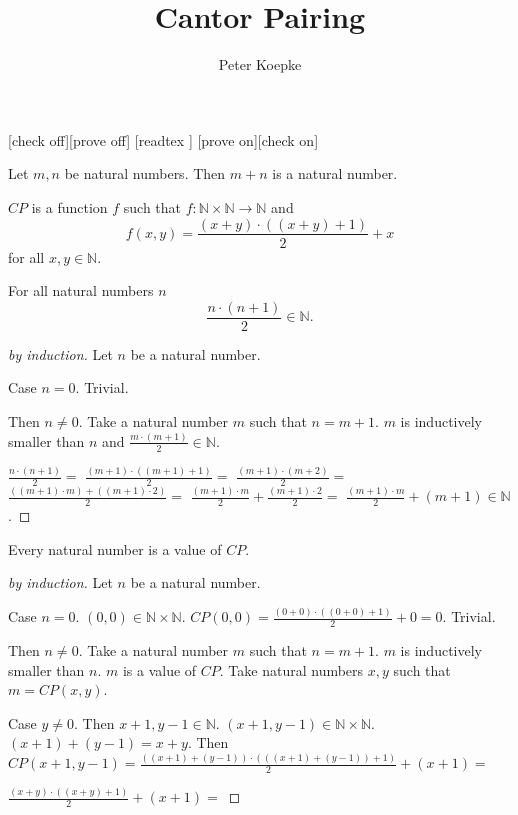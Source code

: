 \documentclass{article}
\title{Cantor Pairing}
\author{Peter Koepke}
\date{}
\begin{document}
\begin{forthel}

[check off][prove off]
[readtex ]
[prove on][check on]

\begin{lemma}
Let $m,n$ be natural numbers. Then $m+n$ is a natural number.
\end{lemma}

\begin{signature}
$CP$ is a function $f$ such that 
$f : \mathbb{N} \times \mathbb{N} \rightarrow \mathbb{N}$
and \[f(x,y) = \frac{(x+y)\cdot((x+y)+1)}{2} + x\]
 for all $x,y \in \mathbb{N}$.
\end{signature}

\begin{lemma}
For all natural numbers $n$
\[\frac{n \cdot (n+1)}{2} \in \mathbb{N}.\]
\end{lemma}
\begin{proof}[by induction]
Let $n$ be a natural number.

Case $n=0$. Trivial.

Then $n \neq 0$. Take a natural number $m$ such that $n = m + 1$.
$m$ is inductively smaller than $n$ and
$\frac{m \cdot (m+1)}{2} \in \mathbb{N}$.

$\frac{n \cdot (n+1)}{2} =$
%
$\frac{(m+1) \cdot ((m+1)+1)}{2} =$
%
$\frac{(m+1) \cdot (m+2)}{2} =$
%
$\frac{((m+1) \cdot m) + ((m+1) \cdot 2)}{2} =$
%
$\frac{(m+1) \cdot m}{2} + \frac{(m+1) \cdot 2}{2} =$
%
$\frac{(m+1) \cdot m}{2} + (m+1) \in \mathbb{N}$.
\end{proof}

\begin{lemma}
Every natural number is a value of $CP$.
\end{lemma}
\begin{proof}[by induction]
Let $n$ be a natural number.

Case $n = 0$. $(0,0) \in \mathbb{N} \times \mathbb{N}$.
$CP(0,0) = \frac{(0+0)\cdot((0+0)+1)}{2} + 0 = 0$. Trivial.

Then $n \neq 0$. Take a natural number $m$ such that $n = m + 1$.
$m$ is inductively smaller than $n$.
$m$ is a value of $CP$.
Take natural numbers $x,y$ such that
$m = CP(x,y)$.

Case $y \neq 0$. Then $x+1, y-1 \in \mathbb{N}$. $(x+1,y-1) \in \mathbb{N} \times \mathbb{N}$.
$(x+1)+(y-1)=x+y$. 
Then $CP(x+1,y-1) = 
\frac{((x+1)+(y-1))\cdot(((x+1)+(y-1))+1)}{2} + (x + 1) =$

$\frac{(x+y)\cdot((x+y)+1)}{2} + (x + 1) = $


\end{proof}
\end{forthel}
\end{document}
